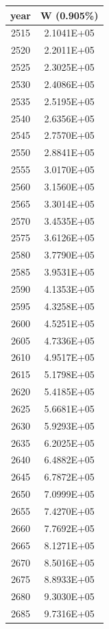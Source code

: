 \documentclass[a4paper]{article}
\begin{document}
	\begin{tabular}{|c|c|}
		\hline
		year & W (0.905\%) \\
		\hline
		2515 & 2.1041E+05 \\
		\hline
		2520 & 2.2011E+05 \\
		\hline
		2525 & 2.3025E+05 \\
		\hline
		2530 & 2.4086E+05 \\
		\hline
		2535 & 2.5195E+05 \\
		\hline
		2540 & 2.6356E+05 \\
		\hline
		2545 & 2.7570E+05 \\
		\hline
		2550 & 2.8841E+05 \\
		\hline
		2555 & 3.0170E+05 \\
		\hline
		2560 & 3.1560E+05 \\
		\hline
		2565 & 3.3014E+05 \\
		\hline
		2570 & 3.4535E+05 \\
		\hline
		2575 & 3.6126E+05 \\
		\hline
		2580 & 3.7790E+05 \\
		\hline
		2585 & 3.9531E+05 \\
		\hline
		2590 & 4.1353E+05 \\
		\hline
		2595 & 4.3258E+05 \\
		\hline
		2600 & 4.5251E+05 \\
		\hline
		2605 & 4.7336E+05 \\
		\hline
		2610 & 4.9517E+05 \\
		\hline
		2615 & 5.1798E+05 \\
		\hline
		2620 & 5.4185E+05 \\
		\hline
		2625 & 5.6681E+05 \\
		\hline
		2630 & 5.9293E+05 \\
		\hline
		2635 & 6.2025E+05 \\
		\hline
		2640 & 6.4882E+05 \\
		\hline
		2645 & 6.7872E+05 \\
		\hline
		2650 & 7.0999E+05 \\
		\hline
		2655 & 7.4270E+05 \\
		\hline
		2660 & 7.7692E+05 \\
		\hline
		2665 & 8.1271E+05 \\
		\hline
		2670 & 8.5016E+05 \\
		\hline
		2675 & 8.8933E+05 \\
		\hline
		2680 & 9.3030E+05 \\
		\hline
		2685 & 9.7316E+05 \\

\end{tabular}
\end{document}
